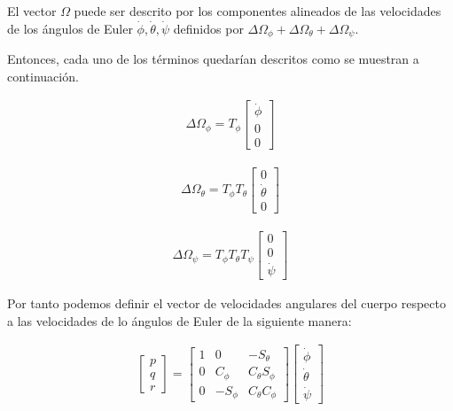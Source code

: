 El vector $\Omega$ puede ser descrito por los componentes alineados de las velocidades de los ángulos de Euler $ \dot \phi, \dot \theta, \dot \psi$ definidos por $\Delta \Omega_{\phi} + \Delta \Omega_{\theta} + \Delta \Omega_{\psi}$.

Entonces, cada uno de los términos quedarían descritos como se muestran a continuación.

\begin{gather}
\label{euler1}
    \Delta \Omega_{\phi}
    =
    T_{\phi}
    \begin{bmatrix}
    \dot \phi\\
    0\\
    0
    \end{bmatrix}
\end{gather}

\begin{gather}
    \Delta \Omega_{\theta}
    =
    T_{\phi} T_{\theta}
    \begin{bmatrix}
    0\\
    \dot \theta\\
    0
    \end{bmatrix}
\end{gather}

\begin{gather}
\label{eueler2}
    \Delta \Omega_{\psi}
    =
    T_{\phi} T_{\theta} T_{\psi}
    \begin{bmatrix}
    0\\
    0\\
    \dot \psi
    \end{bmatrix}
\end{gather}

Por tanto podemos definir el vector de velocidades angulares del cuerpo respecto a las velocidades de lo ángulos de Euler de la siguiente manera:

\begin{gather}
\label{velocidad angular aeronave}
    \begin{bmatrix}
    p\\
    q\\
    r
    \end{bmatrix}
    =
    \begin{bmatrix}
    1 & 0 & -S_{\theta}\\
    0 & C_{\phi} & C_{\theta} S_{\phi}\\
    0 & -S_{\phi} & C_{\theta} C_{\phi}
    \end{bmatrix}
    \begin{bmatrix}
    \dot \phi\\
    \dot \theta\\
    \dot \psi
    \end{bmatrix}
\end{gather}

